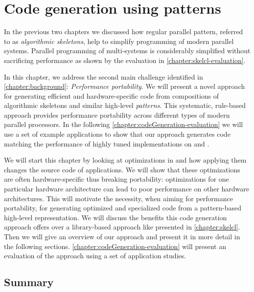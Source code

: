 
\chapter{Code generation using patterns}

\label{ch:fifth} %
\label{chapter:codeGeneration}

In the previous two chapters we discussed how regular parallel pattern, referred to as \emph{algorithmic skeletons}, help to simplify programming of modern parallel systems.
Parallel programming of multi-\GPU systems is considerably simplified without sacrificing performance as shown by the evaluation in \autoref{chapter:skelcl-evaluation}.

In this chapter, we address the second main challenge identified in \autoref{chapter:background}: \emph{Performance portability}.
We will present a novel approach for generating efficient and hardware-specific code from compositions of algorithmic skeletons and similar high-level \emph{patterns}.
This systematic, rule-based approach provides performance portability across different types of modern parallel processors. 
In the following \autoref{chapter:codeGeneration-evaluation} we will use a set of example applications to show that our approach generates code matching the performance of highly tuned implementations on \CPUs and \GPUs.

We will start this chapter by looking at optimizations in \OpenCL and how applying them changes the source code of applications.
We will show that these optimizations are often hardware-specific thus breaking portability: optimizations for one particular hardware architecture can lead to poor performance on other hardware architectures.
This will motivate the necessity, when aiming for performance portability, for generating optimized and specialized code from a pattern-based high-level representation.
We will discuss the benefits this code generation approach offers over a library-based approach like \SkelCL presented in \autoref{chapter:skelcl}.
Then we will give an overview of our approach and present it in more detail in the following sections.
\autoref{chapter:codeGeneration-evaluation} will present an evaluation of the approach using a set of application studies.

\newpage











\section{Summary}


